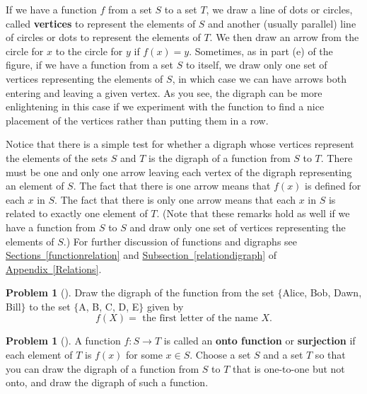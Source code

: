 \documentclass[10pt,]{book}
\newcommand{\terminology}[1]{\textbf{#1}}
\theoremstyle{plain}
\theoremstyle{definition}
\newtheorem{activity}[project]{Problem}
\theoremstyle{definition}
\numberwithin{equation}{chapter}
\begin{document}
If we have a function \(f\) from a set \(S\) to a set \(T\), we draw a line of dots or circles, called \terminology{vertices} to represent the elements of \(S\) and another (usually parallel) line of circles or dots to represent the elements of \(T\). We then draw an arrow from the circle for \(x\) to the circle for \(y\) if \(f(x) = y\). Sometimes, as in part (e) of the figure, if we have a function from a set \(S\) to itself, we draw only one set of vertices representing the elements of \(S\), in which case we can have arrows both entering and leaving a given vertex. As you see, the digraph can be more enlightening in this case if we experiment with the function to find a nice placement of the vertices rather than putting them in a row.%
\par
Notice that there is a simple test for whether a digraph whose vertices represent the elements of the sets \(S\) and \(T\) is the digraph of a function from \(S\) to \(T\). There must be one and only one arrow leaving each vertex of the digraph representing an element of \(S\). The fact that there is one arrow means that \(f(x)\) is defined for each \(x\) in \(S\). The fact that there is only one arrow means that each \(x\) in \(S\) is related to exactly one element of \(T\). (Note that these remarks hold as well if we have a function from \(S\) to \(S\) and draw only one set of vertices representing the elements of \(S\).) For further discussion of functions and digraphs see \hyperref[functionrelation]{Sections~\ref{functionrelation}} and \hyperref[relationdigraph]{Subsection~\ref{relationdigraph}} of {\hyperref[Relations]{Appendix~\ref{Relations}}}.%
\begin{activity}[] \label{activity-23}
Draw the digraph of the function from the set \(\{\)Alice, Bob, Dawn, Bill\(\}\) to the set \(\{\)A, B, C, D, E\(\}\) given by%
\begin{equation*}
f(X) = \text{ the first letter of the name }X .
\end{equation*}
%
\end{activity}
\begin{activity}[] \label{activity-24}
A function \(f:S\rightarrow T\) is called an \terminology{onto function} or \terminology{surjection} if each element of \(T\) is \(f(x)\) for some \(x\in S\). Choose a set \(S\) and a set \(T\) so that you can draw the digraph of a function from \(S\) to \(T\) that is one-to-one but not onto, and draw the digraph of such a function.%
\end{activity}
\end{document}
